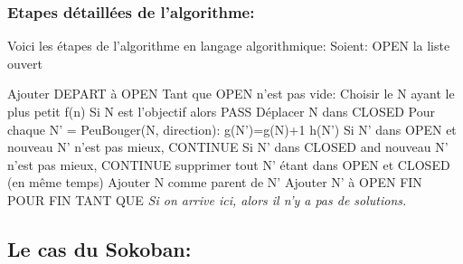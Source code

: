 \documentclass{article}
\begin{document}
\subsubsection{Etapes détaillées de l'algorithme:}
Voici les étapes de l'algorithme en langage algorithmique: \newline
Soient: OPEN la liste ouvert \newline

Ajouter DEPART à OPEN \newline
Tant que OPEN n'est pas vide:\newline
	Choisir le N ayant le plus petit f(n)\newline
	Si N est l'objectif alors PASS\newline
	Déplacer N dans CLOSED\newline
	Pour chaque N' = PeuBouger(N, direction):\newline
		g(N')=g(N)+1\newline
		h(N')\newline
		Si N' dans OPEN et nouveau N' n'est pas mieux, CONTINUE\newline
		Si N' dans CLOSED and nouveau N' n'est pas mieux, CONTINUE\newline
		supprimer tout N' étant dans OPEN et CLOSED (en même temps)\newline
		Ajouter N comme parent de N'\newline
		Ajouter N' à OPEN\newline
	FIN POUR\newline
FIN TANT QUE\newline
\textit{Si on arrive ici, alors il n'y a pas de solutions.}
			
\subsection{Le cas du Sokoban:}
\end{document}
